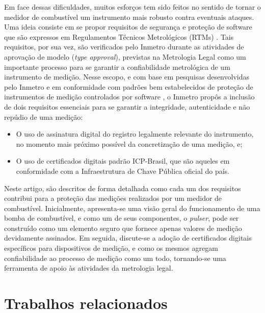 \documentclass[12pt]{article}
\begin{document}
Em face dessas dificuldades, muitos esforços tem sido feitos no sentido de tornar o medidor de combustível um instrumento mais robusto contra eventuais ataques.
Uma ideia consiste em se propor requisitos de segurança e proteção de software que são expressos em Regulamentos Técnicos Metrológicos (RTMs) \cite{Leitao2014a}.
Tais requisitos, por sua vez, são verificados pelo Inmetro durante as atividades de aprovação de modelo (\textit{type approval})\cite{RodriguesFilho2015}, previstas na Metrologia Legal como um importante processo para se garantir a confiabilidade metrológica de um instrumento de medição.
Nesse escopo, e com base em pesquisas desenvolvidas pelo Inmetro e em conformidade com padrões bem estabelecidos de proteção de instrumentos de medição controlados por software \cite{EuropeanCooperationinLegalMetrologyWELMEC2015,InternationalOrganizationofLegalMetrologyOIML2008}, o Inmetro propôs a inclusão de dois requisitos essenciais para se garantir a integridade, autenticidade e não repúdio de uma medição:

\begin{itemize}
    \item O uso de assinatura digital do registro legalmente relevante do instrumento, no momento mais próximo possível da concretização de uma medição, e;
    \item O uso de certificados digitais padrão ICP-Brasil, que são aqueles em conformidade com a Infraestrutura de Chave Pública oficial do país.
\end{itemize}

Neste artigo, são descritos de forma detalhada como cada um dos requisitos contribui para a proteção das medições realizados por um medidor de combustível.
Inicialmente, apresenta-se uma visão geral do funcionamento de uma bomba de combustível, e como um de seus componentes, o \textit{pulser}, pode ser construído como um elemento seguro que fornece apenas valores de medição devidamente assinados.
Em seguida, discute-se a adoção de certificados digitais específicos para dispositivos de medição, e como os mesmos agregam confiabilidade ao processo de medição como um todo, tornando-se uma ferramenta de apoio às atividades da metrologia legal.

\section{Trabalhos relacionados}
\end{document}
